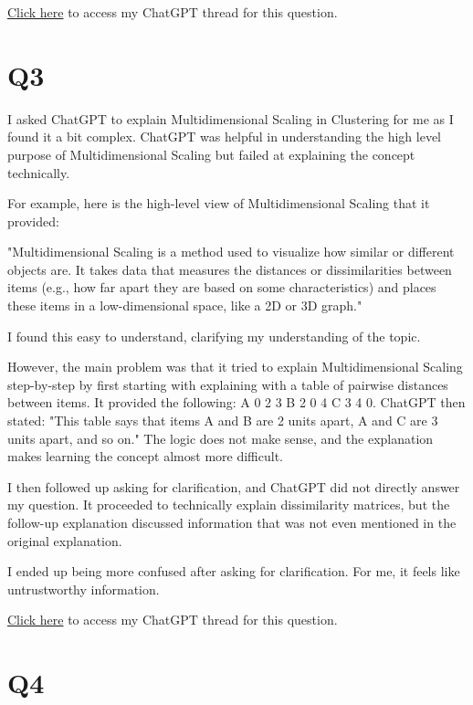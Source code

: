 \documentclass[12pt]{article}
\begin{document}
\href{https://chatgpt.com/share/674bc4a1-1b88-8010-bccf-b5922594932e}{Click here} to access my ChatGPT thread for this question.


\section*{Q3}

I asked ChatGPT to explain Multidimensional Scaling in Clustering for me as I found it a bit complex. ChatGPT was helpful in understanding the high level purpose of Multidimensional Scaling but failed at explaining the concept technically. 

For example, here is the high-level view of Multidimensional Scaling that it provided:

"Multidimensional Scaling is a method used to visualize how similar or different objects are. It takes data that measures the distances or dissimilarities between items (e.g., how far apart they are based on some characteristics) and places these items in a low-dimensional space, like a 2D or 3D graph."

I found this easy to understand, clarifying my understanding of the topic.

However, the main problem was that it tried to explain Multidimensional Scaling step-by-step by first starting with explaining with a table of pairwise distances between items. It provided the following: A 0 2 3 B 2 0 4 C 3 4 0. ChatGPT then stated: "This table says that items A and B are 2 units apart, A and C are 3 units apart, and so on." The logic does not make sense, and the explanation makes learning the concept almost more difficult. 

I then followed up asking for clarification, and ChatGPT did not directly answer my question. It proceeded to technically explain dissimilarity matrices, but the follow-up explanation discussed information that was not even mentioned in the original explanation. 

I ended up being more confused after asking for clarification. For me, it feels like untrustworthy information.

\href{https://chatgpt.com/share/674c7a1f-8b54-8010-8ccb-1ee336c79273}{Click here} to access my ChatGPT thread for this question.


\section*{Q4}
\end{document}
